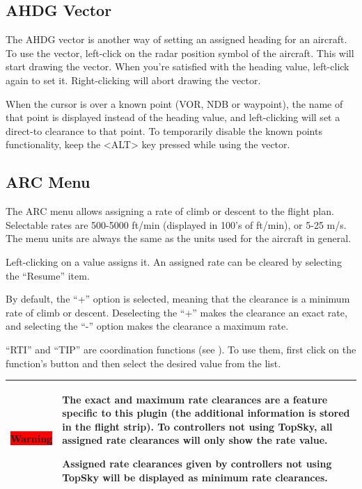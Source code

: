 \documentclass[a4paper,oneside,11pt]{memoir}
\newcommand{\winref}[1]{\textit{\titleref{#1}}}
\newcommand\capdimage[2]{
\begin{center}
\hspace{1em}%
\vtop{%
\centering
\texttt{[image: \#1]}%
\captionof{figure}{#2}%
}%
\end{center}
\ignorespaces}
\newcommand{\warn}[1]{
  \begin{center}
    
    \begin{tabular}{| P{1.5cm}|p{10.5cm} |}
      \hline
      \cellcolor{shadecolor}\colorbox{red}{\color{white}Warning} &\cellcolor{shadecolor} #1 \\ \hline
    \end{tabular}
  \end{center}
}
\begin{document}
\subsection{AHDG Vector}
\label{menu:ahdgv}
The AHDG vector is another way of setting an assigned heading for an aircraft. To use the vector, left-click on the radar position symbol of the aircraft. This will start drawing the vector. When you’re satisfied with the heading value, left-click again to set it. Right-clicking will abort drawing the vector.

\bigskip

When the cursor is over a known point (VOR, NDB or waypoint), the name of that point is displayed instead of the heading value, and left-clicking will set a direct-to clearance to that point. To temporarily disable the known points functionality, keep the <ALT> key pressed while using the vector.

\subsection{ARC Menu}
\label{menu:arc}

\capdimage{img/arc.png}{ARC Menu}

The ARC menu allows assigning a rate of climb or descent to the flight plan. Selectable rates are 500-5000 ft/min (displayed in 100’s of ft/min), or 5-25 m/s. The menu units are always the same as the units used for the aircraft in general.

\bigskip

Left-clicking on a value assigns it. An assigned rate can be cleared by selecting the “Resume” item.

\bigskip

By default, the “+” option is selected, meaning that the clearance is a minimum rate of climb or descent. Deselecting the “+” makes the clearance an exact rate, and selecting the “-” option makes the clearance a maximum rate.

\bigskip

“RTI” and “TIP” are coordination functions (see \winref{win:rti}). To use them, first click on the function’s button and then select the desired value from the list.

\warn{The exact and maximum rate clearances are a feature specific to this plugin (the additional information is stored in the flight strip). To controllers not using TopSky, all assigned rate clearances will only show the rate value.

Assigned rate clearances given by controllers not using TopSky will be displayed as minimum rate clearances. }
\end{document}
